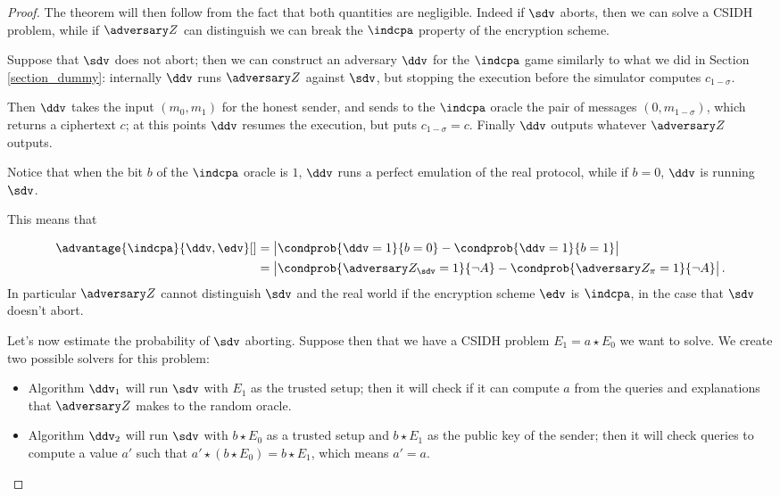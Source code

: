 \begin{proof}
    The theorem will then follow from the fact that both quantities are negligible. Indeed if $\sdv$ aborts, then we can solve a CSIDH problem, while if $\zdv$ can distinguish we can break the $\indcpa$ property of the encryption scheme.
    
    Suppose that $\sdv$ does not abort; then we can construct an adversary $\ddv$ for the $\indcpa$ game similarly to what we did in Section \ref{section_dummy}: internally $\ddv$ runs $\zdv$ against $\sdv$, but stopping the execution before the simulator computes $c_{1-\sigma}$.
    
    Then $\ddv$ takes the input $(m_0,m_1)$ for the honest sender, and sends to the $\indcpa$ oracle the pair of messages $(0,m_{1-\sigma})$, which returns a ciphertext $c$; at this points $\ddv$ resumes the execution, but puts $c_{1-\sigma}=c$. Finally $\ddv$ outputs whatever $\zdv$ outputs.
    
    Notice that when the bit $b$ of the $\indcpa$ oracle is $1$, $\ddv$ runs a perfect emulation of the real protocol, while if $b=0$, $\ddv$ is running $\sdv$.
    
    This means that
    
    \begin{align*}
    \advantage{\indcpa}{\ddv,\edv}[] &= \left| \condprob{\ddv=1}{b=0} -  \condprob{\ddv=1}{b=1}\right|\\
    & = \left| \condprob{\zdv_\sdv=1}{\neg A} - \condprob{\zdv_\pi=1}{\neg A} \right|.
    \end{align*}
    In particular $\zdv$ cannot distinguish $\sdv$ and the real world if the encryption scheme $\edv$ is $\indcpa$, in the case that $\sdv$ doesn't abort.    
    
    Let's now estimate the probability of $\sdv$ aborting. Suppose then that we have a CSIDH problem $E_1=a\star E_0$ we want to solve. We create two possible solvers for this problem:
    \begin{itemize}
        \item Algorithm $\ddv_1$ will run $\sdv$ with $E_1$ as the trusted setup; then it will check if it can compute $a$ from the queries and explanations that $\zdv$ makes to the random oracle.
        \item Algorithm $\ddv_2$ will run $\sdv$ with $b\star E_0$ as a trusted setup and $b\star E_1$ as the public key of the sender; then it will check queries to compute a value $a'$ such that $a'\star(b\star E_0)=b\star E_1$, which means $a'=a$.
    \end{itemize}
    

\end{proof}
